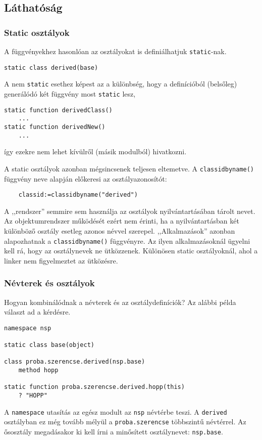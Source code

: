 \subsection{Láthatóság}

\subsubsection{Static osztályok}
A függvényekhez hasonlóan az osztályokat is definiálhatjuk \verb!static!-nak.
\begin{verbatim}
static class derived(base)
\end{verbatim}
A nem \verb!static! esethez képest az a különbség, hogy a definícióból
(belsőleg) generálódó két függvény most \verb!static! lesz,
\begin{verbatim}
static function derivedClass()
    ...
static function derivedNew()
    ...
\end{verbatim}
így ezekre nem lehet kívülről (másik modulból) hivatkozni. 

A static osztályok azonban mégsincsenek teljesen eltemetve.
A \verb!classidbyname()! függvény neve alapján előkeresi az osztályazonosítót:
\begin{verbatim}
    classid:=classidbyname("derived")
\end{verbatim}
A ,,rendszer'' semmire sem használja az osztályok nyilvántartásában
tárolt nevet. Az objektumrendszer működését ezért nem érinti, ha a nyilvántartásban
két különböző osztály esetleg azonos névvel szerepel. ,,Alkalmazások'' azonban 
alapozhatnak a \verb!classidbyname()! függvényre. Az ilyen alkalmazásoknál
ügyelni kell rá, hogy az osztálynevek ne ütközzenek. Különösen static
osztályoknál, ahol a linker nem figyelmeztet az ütközésre.


\subsubsection{Névterek és osztályok}
Hogyan kombinálódnak a névterek és az osztálydefiníciók?
Az alábbi példa választ ad a kérdésre.
\begin{verbatim}
namespace nsp

static class base(object)

class proba.szerencse.derived(nsp.base)
    method hopp

static function proba.szerencse.derived.hopp(this)
    ? "HOPP"
\end{verbatim}
A \verb!namespace! utasítás az egész modult az \verb!nsp! névtérbe teszi.
A \verb!derived! osztályban ez még tovább mélyül a \verb!proba.szerencse! 
többszintű névtérrel.
Az ősosztály megadásakor ki kell írni a minősített osztálynevet: \verb!nsp.base!.

